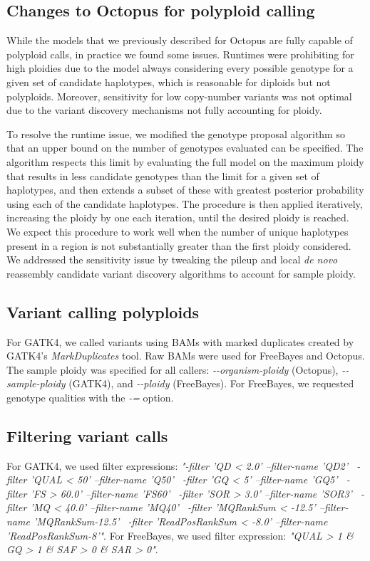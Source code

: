 \documentclass[notitlepage, twocolumn, 10pt]{article}
\begin{document}
\subsection*{Changes to Octopus for polyploid calling}

While the models that we previously described for Octopus \cite{RN844} are fully capable of polyploid calls, in practice we found some issues. Runtimes were prohibiting for high ploidies due to the model always considering every possible genotype for a given set of candidate haplotypes, which is reasonable for diploids but not polyploids. Moreover, sensitivity for low copy-number variants was not optimal due to the variant discovery mechanisms not fully accounting for ploidy.

To resolve the runtime issue, we modified the genotype proposal algorithm so that an upper bound on the number of genotypes evaluated can be specified. The algorithm respects this limit by evaluating the full model on the maximum ploidy that results in less candidate genotypes than the limit for a given set of haplotypes, and then extends a subset of these with greatest posterior probability using each of the candidate haplotypes. The procedure is then applied iteratively, increasing the ploidy by one each iteration, until the desired ploidy is reached. We expect this procedure to work well when the number of unique haplotypes present in a region is not substantially greater than the first ploidy considered. We addressed the sensitivity issue by tweaking the pileup and local \emph{de novo} reassembly candidate variant discovery algorithms to account for sample ploidy.

\subsection*{Variant calling polyploids} For GATK4, we called variants using BAMs with marked duplicates created by GATK4's \emph{MarkDuplicates} tool. Raw BAMs were used for FreeBayes and Octopus. The sample ploidy was specified for all callers: \emph{-{}-organism-ploidy} (Octopus), \emph{-{}-sample-ploidy} (GATK4), and \emph{-{}-ploidy} (FreeBayes). For FreeBayes, we requested genotype qualities with the \emph{-=} option.

\subsection*{Filtering variant calls} For GATK4, we used filter expressions: \emph{"-filter 'QD < 2.0' --filter-name 'QD2' \
		 -filter 'QUAL < 50' --filter-name 'Q50' \
		 -filter 'GQ < 5' --filter-name 'GQ5' \
		 -filter 'FS > 60.0' --filter-name 'FS60' \
		 -filter 'SOR > 3.0' --filter-name 'SOR3' \
		 -filter 'MQ < 40.0' --filter-name 'MQ40' \
		 -filter 'MQRankSum < -12.5' --filter-name 'MQRankSum-12.5' \
		 -filter 'ReadPosRankSum < -8.0' --filter-name 'ReadPosRankSum-8'"}.
For FreeBayes, we used filter expression: \emph{"QUAL > 1 \& GQ > 1 \& SAF > 0 \& SAR > 0"}.
\end{document}
